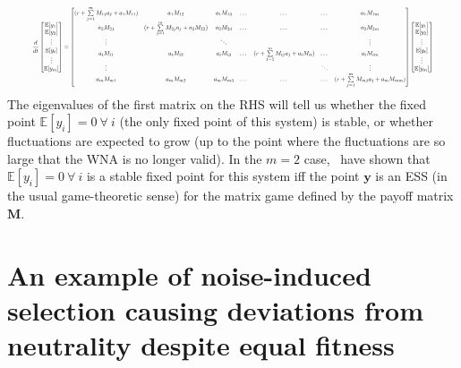 \begin{equation}
\resizebox{0.93\textwidth}{!}{$\displaystyle
	\frac{d}{dt}\begin{bmatrix}
	\mathbb{E}[y_1]\\
	\mathbb{E}[y_2]\\
	\vdots\\
	\mathbb{E}[y_i]\\
	\vdots\\
	\mathbb{E}[y_m]
	\end{bmatrix}
	=
	\begin{bmatrix}
	(r + \sum\limits_{j=1}^{m}M_{1j}a_j + a_1M_{11}) & a_1M_{12} & a_1M_{13} & \dots & \dots & \dots & a_1M_{1m}\\
	a_2M_{21} & (r + \sum\limits_{j=1}^{m}M_{2j}a_j + a_2M_{22}) & a_2M_{23} & \dots & \dots & \dots & a_2M_{2m}\\
	\vdots &  & \ddots & &  & & \vdots\\
	a_{i}M_{i1} & a_iM_{i2} & a_iM_{i3} & \dots & (r + \sum\limits_{j=1}^{m}M_{ij}a_j + a_iM_{ii}) & \dots & a_iM_{im}\\
	\vdots &  &  & & & \ddots & \vdots\\
	a_mM_{m1} & a_mM_{m2} & a_mM_{m3} & \dots & \dots & \dots & (r + \sum\limits_{j=1}^{m}M_{mj}a_j + a_mM_{mm})
	\end{bmatrix}
	\begin{bmatrix}
	\mathbb{E}[y_1]\\
	\mathbb{E}[y_2]\\
	\vdots\\
	\mathbb{E}[y_i]\\
	\vdots\\
	\mathbb{E}[y_m]
	\end{bmatrix}
	$}
\end{equation}
The eigenvalues of the first matrix on the RHS will tell us whether the fixed point $\mathbb{E}[y_i] = 0 \ \forall \ i$ (the only fixed point of this system) is stable, or whether fluctuations are expected to grow (up to the point where the fluctuations are so large that the WNA is no longer valid). In the $m=2$ case,~\cite{tao_stochastic_2007} have shown that $\mathbb{E}[y_i] = 0 \ \forall \ i$ is a stable fixed point for this system iff the point $\mathbf{y}$ is an ESS (in the usual game-theoretic sense) for the matrix game defined by the payoff matrix $\mathbf{M}$.

\section{An example of noise-induced selection causing deviations from neutrality despite equal fitness}

